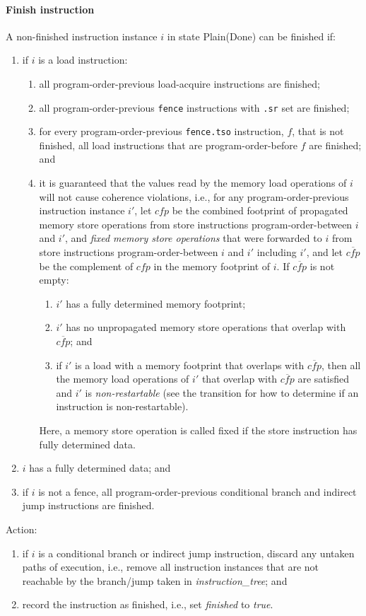 \paragraph{Finish instruction}\label{omm:finish}
A non-finished instruction instance $i$ in state {\sc Plain}({\sc Done}) can be finished if:
\begin{enumerate}
\item if $i$ is a load instruction:
  \begin{enumerate}
  \item all program-order-previous load-acquire instructions are finished;
  \item all program-order-previous {\tt fence} instructions with {\tt .sr} set are finished;
  \item for every program-order-previous {\tt fence.tso} instruction, $f$, that is not finished, all load instructions that are program-order-before $f$ are finished; and
  \item it is guaranteed that the values read by the memory load operations of $i$ will not cause coherence violations, i.e., for any program-order-previous instruction instance $i'$, let $\textit{cfp}$ be the combined footprint of propagated memory store operations from store instructions program-order-between $i$ and $i'$, and {\em fixed memory store operations} that were forwarded to $i$ from store instructions program-order-between $i$ and $i'$ including $i'$, and let $\overline{\textit{cfp}}$ be the complement of $\textit{cfp}$ in the memory footprint of $i$.
  If $\overline{\textit{cfp}}$ is not empty:
    \begin{enumerate}
    \item $i'$ has a fully determined memory footprint;
    \item $i'$ has no unpropagated memory store operations that overlap with $\overline{\textit{cfp}}$; and
    \item if $i'$ is a load with a memory footprint that overlaps with $\overline{\textit{cfp}}$, then all the memory load operations of $i'$ that overlap with $\overline{\textit{cfp}}$ are satisfied and $i'$ is {\em non-restartable} (see the  transition for how to determine if an instruction is non-restartable).
    \end{enumerate}
  Here, a memory store operation is called fixed if the store instruction has fully determined data.
  \end{enumerate}
\item $i$ has a fully determined data; and
\item if $i$ is not a fence, all program-order-previous conditional branch and indirect jump instructions are finished.
\end{enumerate}
Action:
\begin{enumerate}
\item if $i$ is a conditional branch or indirect jump instruction, discard any untaken paths of execution, i.e., remove all instruction instances that are not reachable by the branch/jump taken in {\it instruction\_tree}; and
\item record the instruction as finished, i.e., set {\it finished} to {\it true}.
\end{enumerate}


